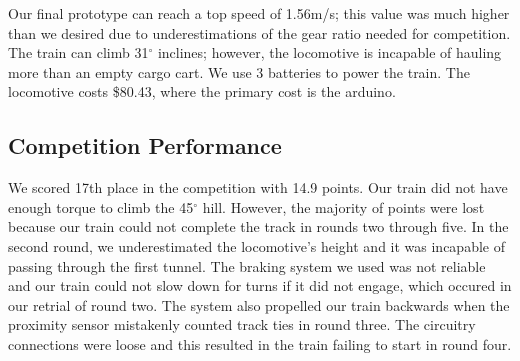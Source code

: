 \documentclass[class=../report, crop=false]{standalone}
\begin{document}
Our final prototype can reach a top speed of 1.56m/s; this value was much higher than we desired due to underestimations of the gear ratio needed for competition.
The train can climb 31$^{\circ}$ inclines; however, the locomotive is incapable of hauling more than an empty cargo cart.
We use 3 batteries to power the train.
The locomotive costs \$80.43\footnotemark, where the primary cost is the \gls{arduino}.

\subsection{Competition Performance}

We scored 17th place in the competition with 14.9 points.
Our train did not have enough torque to climb the 45$^{\circ}$ hill.
However, the majority of points were lost because our train could not complete the track in rounds two through five.
In the second round, we underestimated the locomotive’s height and it was incapable of passing through the first tunnel.
The braking system we used was not reliable and our train could not slow down for turns if it did not engage, which occured in our retrial of round two.
The system also propelled our train backwards when the proximity sensor mistakenly counted track ties in round three.
The circuitry connections were loose and this resulted in the train failing to start in round four.
\end{document}
